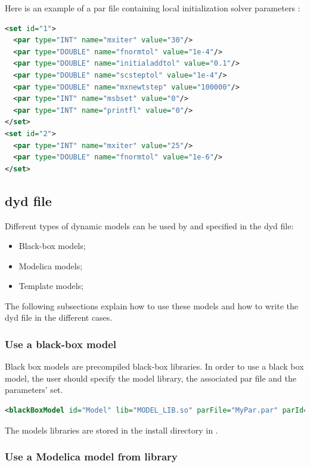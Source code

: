 \documentclass[a4paper, 12pt]{report}
\begin{document}
Here is an example of a par file containing local initialization solver parameters :

\begin{lstlisting}[language=XML]
<set id="1">
  <par type="INT" name="mxiter" value="30"/>
  <par type="DOUBLE" name="fnormtol" value="1e-4"/>
  <par type="DOUBLE" name="initialaddtol" value="0.1"/>
  <par type="DOUBLE" name="scsteptol" value="1e-4"/>
  <par type="DOUBLE" name="mxnewtstep" value="100000"/>
  <par type="INT" name="msbset" value="0"/>
  <par type="INT" name="printfl" value="0"/>
</set>
<set id="2">
  <par type="INT" name="mxiter" value="25"/>
  <par type="DOUBLE" name="fnormtol" value="1e-6"/>
</set>
\end{lstlisting}

\subsection{dyd file}

Different types of dynamic models can be used by \Dynawo and specified in the dyd file:
\begin{itemize}
\item Black-box models;
\item Modelica models;
\item Template models;
\end{itemize}

The following subsections explain how to use these models and how to write the dyd file in the different cases.

\subsubsection{Use a black-box model}

Black box models are precompiled black-box libraries. In order to use a black box model, the user should specify the model library, the associated par file and the parameters' set.
\begin{lstlisting}[language=XML, morekeywords={lib},numbers=none]
<blackBoxModel id="Model" lib="MODEL_LIB.so" parFile="MyPar.par" parId="5">
\end{lstlisting}

The models libraries are stored in the install directory in .

\subsubsection[Use a Modelica model from Dynawo library]{Use a Modelica model from \Dynawo library}
\end{document}
